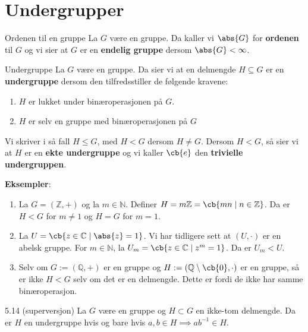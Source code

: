 \section{Undergrupper}

\begin{definition}{Ordenen til en gruppe}{}
	La $G$ være en gruppe. Da kaller vi $\abs{G}$ for \textbf{ordenen} til $G$ og vi
	sier at $G$ er en \textbf{endelig gruppe} dersom $\abs{G} < \infty$.
\end{definition}

\begin{definition}{Undergruppe}{}
	La $G$ være en gruppe. Da sier vi at en delmengde $H \subseteq G$ er en
	\textbf{undergruppe} dersom den tilfredsstiller de følgende kravene:
	\begin{enumerate}
		\item $H$ er lukket under binæroperasjonen på $G$.
		\item $H$ er selv en gruppe med binæroperasjonen på $G$
	\end{enumerate}
	Vi skriver i så fall $H \leq G$, med $H < G$ dersom $H \neq G$. Dersom $H < G$, så
	sier vi at $H$ er en \textbf{ekte undergruppe} og vi kaller $\cb{e}$ den
	\textbf{trivielle undergruppen}.
\end{definition}

\textbf{Eksempler}:
\begin{enumerate}
	\item La $G = (\mathbb{Z}, +)$ og la $m \in \mathbb{N}$. Definer
	      $H=m\mathbb{Z} = \cb{mn\mid n\in\mathbb{Z}}$. Da er $H < G$ for $m \neq 1$ og
	      $H = G$ for $m = 1$.
	\item La $U = \cb{z\in \mathbb{C}\mid \abs{z} = 1}$. Vi har tidligere sett at
	      $(U, \cdot)$ er en abelsk gruppe. For $m \in \mathbb{N}$, la
	      $U_m = \cb{z\in\mathbb{C}\mid z^m = 1}$. Da er $U_m < U$.
	\item Selv om $G:=(\mathbb{Q}, +)$ er en gruppe og
	      $H:=(\mathbb{Q}\setminus \cb{0}, \cdot)$ er en gruppe, så er ikke $H<G$ selv om
	      det er en delmengde. Dette er fordi de ikke har samme binæroperasjon.
\end{enumerate}

\begin{theorem*}{5.14 (superversjon)}{}
	La $G$ være en gruppe og $H \subset G$ en ikke-tom delmengde. Da er $H$ en
	undergruppe hvis og bare hvis $a, b \in H \implies ab^{-1}\in H$.
\end{theorem*}

